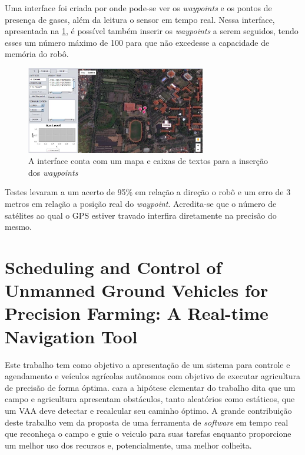 Uma interface foi criada por \cite{Watiasih2017} onde pode-se ver os \textit{waypoints} e os pontos de presença de gases, além da leitura o sensor em tempo real. Nessa interface, apresentada na \ref{fig:gas:interface}, é possível também inserir os \textit{waypoints} a serem seguidos, tendo esses um número máximo de 100 para que não excedesse a capacidade de memória do robô.
\begin{figure}[H]
    \centering
    \includegraphics[width=0.7\textwidth]{figuras/interface_robo_gas.png}
    \caption{A interface conta com um mapa e caixas de textos para a inserção dos \textit{waypoints}}
    \label{fig:gas:interface}
\end{figure}
Testes levaram a um acerto de 95\% em relação a direção o robô e um erro de 3 metros em relação a posição real do \textit{waypoint}. Acredita-se que o número de satélites ao qual o GPS estiver travado interfira diretamente na precisão do mesmo.
\section{Scheduling and Control of Unmanned Ground Vehicles for Precision Farming: A Real-time Navigation Tool}

Este trabalho tem como objetivo a apresentação de um sistema para controle e agendamento  e veículos agrícolas autônomos com objetivo de executar agricultura de precisão de forma óptima. \cite{vlachos:2017} cara a hipótese elementar do trabalho dita que um campo e agricultura apresentam obstáculos, tanto aleatórios como estáticos, que um VAA deve detectar e recalcular seu caminho óptimo.  A grande contribuição deste trabalho vem da proposta de uma ferramenta de  \textit{software} em tempo real que reconheça o campo e guie o veiculo para suas tarefas enquanto proporcione um melhor uso dos recursos e, potencialmente, uma melhor colheita.

